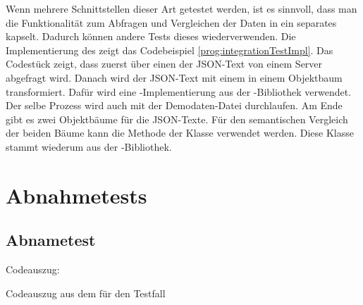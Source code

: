 \SuperPar
Wenn mehrere Schnittstellen dieser Art getestet werden, ist es sinnvoll, dass man die Funktionalität zum Abfragen und Vergleichen der Daten in ein separates  kapselt. Dadurch können andere Tests dieses  wiederverwenden. Die Implementierung des  zeigt das Codebeispiel \ref{prog:integrationTestImpl}. Das Codestück zeigt, dass zuerst über einen  der JSON-Text von einem Server abgefragt wird. Danach wird der JSON-Text mit einem  in einem Objektbaum transformiert. Dafür wird eine -Implementierung aus der -Bibliothek verwendet. Der selbe Prozess wird auch mit der Demodaten-Datei durchlaufen. Am Ende gibt es zwei Objektbäume für die JSON-Texte. Für den semantischen Vergleich der beiden Bäume kann die Methode  der Klasse  verwendet werden. Diese Klasse stammt wiederum aus der -Bibliothek.

\section{Abnahmetests}
\label{cha:TestenUA}
\todo 

\clearpage

\subsection{Abnametest }

\begin{program}

\caption{Codeauszug: }
\label{prog:uatest-find}
\end{program}

\begin{program}

\caption{Codeauszug aus dem  für den Testfall }
\label{prog:uatest-find}
\end{program}

\todo

\clearpage

